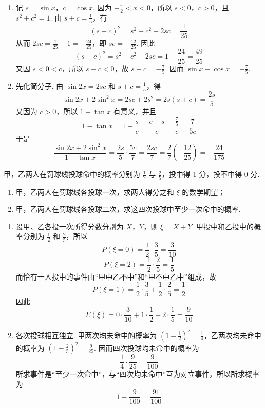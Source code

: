 \begin{solution}
\begin{enumerate}
\item 记 \(s=\sin x\)，\(c=\cos x\). 因为 \(-\frac{\pi}{2}<x<0\)，所以
\(s<0\)，\(c>0\)，且 \(s^2+c^2=1\). 由 \(s+c=\frac{1}{5}\)，有
\[
(s+c)^2=s^2+c^2+2sc=\frac{1}{25}
\]
从而 \(2sc=\frac{1}{25}-1=-\frac{24}{25}\)，即
\(sc=-\frac{12}{25}\). 因此
\[
(s-c)^2=s^2+c^2-2sc=1+\frac{24}{25}=\frac{49}{25}
\]
又因 \(s<0<c\)，所以 \(s-c<0\)，故 \(s-c=-\frac{7}{5}\). 因而
\(\sin x-\cos x=-\frac{7}{5}\).
\item 先化简分子. 由 \(\sin2x=2sc\) 和 \(s+c=\frac{1}{5}\)，得
\[
\sin2x+2\sin^2x=2sc+2s^2=2s(s+c)=\frac{2s}{5}
\]
又因为 \(c>0\)，所以 \(1-\tan x\) 有意义，并且
\[
1-\tan x=1-\frac{s}{c}=\frac{c-s}{c}
=\frac{\frac{7}{5}}{c}=\frac{7}{5c}
\]
于是
\[
\frac{\sin2x+2\sin^2x}{1-\tan x}
=\frac{2s}{5}\cdot\frac{5c}{7}
=\frac{2sc}{7}
=\frac{2}{7}\left(-\frac{12}{25}\right)
=-\frac{24}{175}
\]
\end{enumerate}
\end{solution}

\begin{problem}
甲，乙两人在罚球线投球命中的概率分别为 \(\frac{1}{2}\) 与 \(\frac{2}{5}\)，投中得 1 分，投不中得 0 分.

\begin{enumerate}
\item 甲，乙两人在罚球线各投球一次，求两人得分之和 \(\xi\) 的数学期望；
\item 甲，乙两人在罚球线各投球二次，求这四次投球中至少一次命中的概率.
\end{enumerate}
\end{problem}

\begin{solution}
\begin{enumerate}
\item 设甲、乙各投一次所得分数分别为 \(X\)，\(Y\)，则 \(\xi=X+Y\). 甲投中和乙投中的概率分别为
\(\frac{1}{2}\) 和 \(\frac{2}{5}\)，所以
\[
P(\xi=0)=\frac{1}{2}\cdot\frac{3}{5}=\frac{3}{10}
\]
\[
P(\xi=2)=\frac{1}{2}\cdot\frac{2}{5}=\frac{1}{5}
\]
而恰有一人投中的事件由“甲中乙不中”和“甲不中乙中”组成，故
\[
P(\xi=1)=\frac{1}{2}\cdot\frac{3}{5}
+\frac{1}{2}\cdot\frac{2}{5}=\frac{1}{2}
\]
因此
\[
E(\xi)=0\cdot\frac{3}{10}+1\cdot\frac{1}{2}
+2\cdot\frac{1}{5}=\frac{9}{10}
\]
\item 各次投球相互独立. 甲两次均未命中的概率为
\(\left(1-\frac{1}{2}\right)^2=\frac{1}{4}\)，乙两次均未命中的概率为
\(\left(1-\frac{2}{5}\right)^2=\frac{9}{25}\). 因而四次投球均未命中的概率为
\[
\frac{1}{4}\cdot\frac{9}{25}=\frac{9}{100}
\]
所求事件是“至少一次命中”，与“四次均未命中”互为对立事件，所以所求概率为
\[
1-\frac{9}{100}=\frac{91}{100}
\]
\end{enumerate}
\end{solution}

